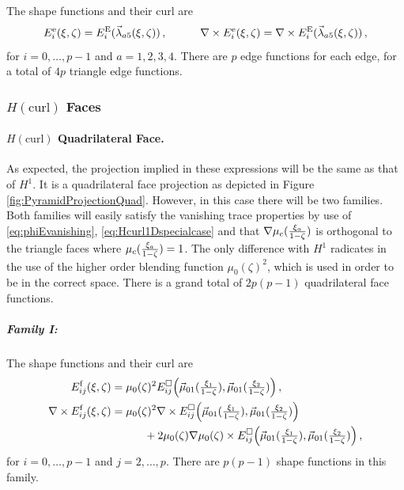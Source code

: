 The shape functions and their curl are
\begin{equation}
	E_i^\mathrm{e}(\xi,\zeta)=E_i^{\mathrm{E}}(\vec{\lambda}_{a5}(\xi,\zeta))\,,\qquad\quad
	\nabla\times E_i^\mathrm{e}(\xi,\zeta)=\nabla \times E_i^{\mathrm{E}}(\vec{\lambda}_{a5}(\xi,\zeta))\,,
	\label{eq:PyrHcurlTriaEdge}
\end{equation}
for $i=0,\ldots,p-1$ and $a=1,2,3,4$.
There are $p$ edge functions for each edge, for a total of $4p$ triangle edge functions.

\subsubsection{\texorpdfstring{$H(\mathrm{curl})$}{Hcurl} Faces}

\paragraph{\texorpdfstring{$H(\mathrm{curl})$}{Hcurl} Quadrilateral Face.} 
As expected, the projection implied in these expressions will be the same as that of $H^1$. 
It is a quadrilateral face projection as depicted in Figure \ref{fig:PyramidProjectionQuad}.
However, in this case there will be two families.
Both families will easily satisfy the vanishing trace properties by use of \eqref{eq:phiEvanishing}, \eqref{eq:Hcurl1Dspecialcase} and that $\nabla\mu_c(\textstyle{\frac{\xi_a}{1-\zeta}})$ is orthogonal to the triangle faces where $\mu_c(\textstyle{\frac{\xi_a}{1-\zeta}})=1$.
The only difference with $H^1$ radicates in the use of the higher order blending function $\mu_0(\zeta)^2$, which is used in order to be in the correct space. 
There is a grand total of $2p(p-1)$ quadrilateral face functions.

\subparagraph{Family I:}
The shape functions and their curl are
\begin{equation}
	\begin{aligned}
		E_{ij}^{\mathrm{f}}(\xi,\zeta)&=\mu_0(\zeta)^2 E_{ij}^\square\Big(\vec{\mu}_{01}(\textstyle{\frac{\xi_1}{1-\zeta}}),\vec{\mu}_{01}(\textstyle{\frac{\xi_2}{1-\zeta}})\Big)\,,\\
		\nabla\times E_{ij}^{\mathrm{f}}(\xi,\zeta)&=\mu_0(\zeta)^2\nabla\times
			E_{ij}^\square\Big(\vec{\mu}_{01}(\textstyle{\frac{\xi_1}{1-\zeta}}),\vec{\mu}_{01}(\textstyle{\frac{\xi_2}{1-\zeta}})\Big)\\
				&\qquad\quad+2\mu_0(\zeta)\nabla\mu_0(\zeta)\times E_{ij}^\square\Big(\vec{\mu}_{01}(\textstyle{\frac{\xi_1}{1-\zeta}}),\vec{\mu}_{01}(\textstyle{\frac{\xi_2}{1-\zeta}})\Big)\,,
	\end{aligned}
	\label{eq:PyrHcurlQuadFaceI}
\end{equation}
for $i=0,\ldots,p-1$ and $j=2,\ldots,p$. 
There are $p(p-1)$ shape functions in this family.

